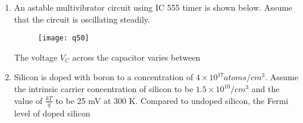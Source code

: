 \documentclass[a4paper, 11pt]{article}
\begin{document}
\begin{enumerate}
    \begin{enumerate}
    \end{enumerate}
    
    \hfill{}
    
    \item An astable multivibrator circuit using IC 555 timer is shown below. Assume that the circuit is oscillating steadily.
    \begin{figure}[H]
        \centering
        \texttt{[image: q50]}
        \caption*{}
        \label{fig:q50}
    \end{figure}
    The voltage $V_C$ across the capacitor varies between
    \begin{enumerate}
    \end{enumerate}
    
    \hfill{}
    
    \item Silicon is doped with boron to a concentration of $4 \times 10^{17} atoms/cm^3$. Assume the intrinsic carrier concentration of silicon to be $1.5 \times 10^{10} /cm^3$ and the value of $\frac{kT}{q}$ to be 25 mV at 300 K. Compared to undoped silicon, the Fermi level of doped silicon
    \begin{enumerate}
    \end{enumerate}
    

\end{enumerate}
\end{document}
